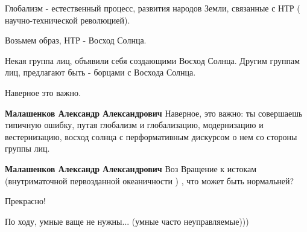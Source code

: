 \begin{itemize}

Глобализм - естественный процесс, развития народов Земли, связанные с НТР (
научно-технической революцией).

Возьмем образ, НТР - Восход Солнца.

Некая группа лиц, объявили себя создающими Восход Солнца. Другим группам лиц,
предлагают быть - борцами с Восхода Солнца.

Наверное это важно.

\begin{itemize}
 
\textbf{Малашенков Александр Александрович} Наверное, это важно: ты совершаешь типичную ошибку, путая глобализм и глобализацию, модернизацию и вестернизацию, восход солнца с перформативным дискурсом о нем со стороны группы лиц.

 
\textbf{Малашенков Александр Александрович} Воз Вращение к истокам (внутриматочной первозданной океаничности ) , что может быть нормальней?
\end{itemize}

 
Прекрасно!

 
По ходу, умные ваще не нужны...
(умные часто неуправляемые)))

\begin{itemize}
 

\end{itemize}
\end{itemize}
